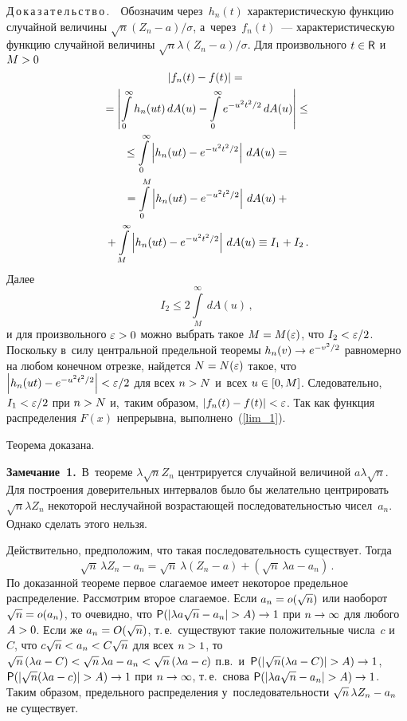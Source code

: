 \begin{multicols}{2}
\noindent
Д\,о\,к\,а\,з\,а\,т\,е\,л\,ь\,с\,т\,в\,о\,.\ \ 
Обозначим через~$h_n(t)$ характеристическую функцию случайной величины 
$\sqrt{n}{(Z_n- a)}/{\sigma}$, а~через~$f_n(t)$~--- характеристическую функцию 
случайной величины $\sqrt{n}{\lambda(Z_n- a)}/{\sigma}$. Для
 произвольного $t\hm\in\mathsf{R}$ и~$M\hm>0$
\begin{multline*}
\left\vert f_n(t)-f(t)\right\vert={}\\
{}=\left\vert\int\limits_{0}^{\infty}h_n(ut)\,dA(u)-
\int\limits_{0}^{\infty}e^{-u^2t^2/2}\,dA(u)\right\vert\leq{}\\
{}\leq\int\limits_{0}^{\infty} \left\vert h_n(ut)-e^{-u^2t^2/2}\right\vert\,dA(u)={}\\
{}=\int\limits_{0}^{M} \left\vert h_n(ut)-e^{-u^2t^2/2}\right\vert\,dA(u)+{}\\
{}+
\int\limits_{M}^{\infty} \left\vert h_n(ut)-e^{-u^2t^2/2}\right\vert\,dA(u)\equiv I_1+I_2\,.
\end{multline*}
Далее
$$
I_2\leq2\int\limits_{M}^{\infty}\,dA(u)\,,
$$
и для произвольного $\varepsilon\hm>0$ можно выбрать такое $M\hm=M(\varepsilon)$, 
что $I_2\hm<\varepsilon/2$. Поскольку в~силу цент\-раль\-ной предельной 
теоремы $h_n(v)\hm\to e^{-v^2/2}$ равномерно на любом конечном отрезке, найдется 
$N\hm=N(\varepsilon)$ такое, что $\abs{h_n(ut)-e^{-u^2t^2/2}}\hm<\varepsilon/2$ 
для всех $n\hm>N$ и~всех $u\hm\in[0,M]$. Следовательно, $I_1\hm<\varepsilon/2$ при 
$n\hm>N$ и,~таким образом, $\abs{f_n(t)-f(t)}\hm<\varepsilon$. Так как функция 
распределения $F(x)$ непрерывна, выполнено~(\ref{lim_1}).

Теорема доказана.

\smallskip

\noindent
\textbf{Замечание~1.}\ В~теореме $\lambda\sqrt{n} Z_n$ центрируется 
случайной величиной $a\lambda\sqrt{n}$. 
Для построения доверительных интервалов было бы желательно центрировать 
$\sqrt{n}\lambda Z_n$ некоторой неслучайной возрастающей последовательностью
 чисел~$a_n$. Однако сделать этого нельзя.

\smallskip

Действительно, предположим, что такая последовательность существует. Тогда
$$
\sqrt{n}\,\lambda Z_n-a_n=\sqrt{n}\,\lambda\left(Z_n- a\right)+
\left(\sqrt{n}\,\lambda a-a_n\right)\,.
$$
По доказанной теореме первое слагаемое имеет некоторое 
предельное распределение. Рассмотрим второе слагаемое. 
Если $a_n\hm=o(\sqrt{n})$ или наоборот $\sqrt{n}\hm=o(a_n)$, то 
очевидно, что ${\sf P}(\abs{\lambda a\sqrt{n}- a_n}\hm>A)\hm\to1$ при 
$n\hm\to\infty$ для любого $A\hm>0$. Если же $a_n\hm=O(\sqrt{n})$, т.\,е.\
 существуют такие положительные числа~$c$ и~$C$, что $c\sqrt{n}\hm<a_n\hm<C\sqrt{n}$ 
 для всех $n\hm>1$, то $\sqrt{n}\left(\lambda a-C\right)\hm<\sqrt{n}\,\lambda a
 \hm-a_n\hm<\sqrt{n}\left(\lambda a\hm-c\right)$ п.в.\ 
 и~${\sf P}(\abs{\sqrt{n}(\lambda a-C)}\hm>A)\hm\to1$, 
 ${\sf P}(\abs{\sqrt{n}(\lambda a-c)}\hm>A)\hm\to1$ при $n\hm\to\infty$, т.\,е.\
 снова 
${\sf P}(\abs{\lambda a\sqrt{n}- a_n}\hm>A)\hm\to1$. Таким образом, 
предельного распределения у~последовательности $\sqrt{n}\,\lambda Z_n\hm-a_n$ 
не существует.


\end{multicols}
